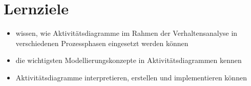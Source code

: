 \section{Lernziele}

\begin{itemize}
    \item wissen, wie Aktivitätsdiagramme im Rahmen der Verhaltensanalyse in verschiedenen Prozessphasen eingesetzt werden können
    \item die wichtigsten Modellierungskonzepte in Aktivitätsdiagrammen kennen
    \item Aktivitätsdiagramme interpretieren, erstellen und implementieren können
\end{itemize}
